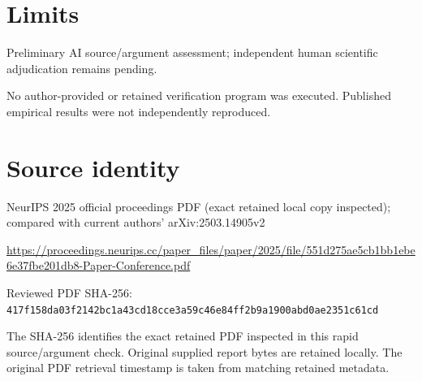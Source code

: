 \documentclass[11pt]{article}
\begin{document}
\section*{Limits}

Preliminary AI source/argument assessment; independent human scientific adjudication remains pending.\par

No author-provided or retained verification program was executed. Published empirical results were not independently reproduced.\par

\section*{Source identity}

NeurIPS 2025 official proceedings PDF (exact retained local copy inspected); compared with current authors’ arXiv:2503.14905v2

\url{https://proceedings.neurips.cc/paper_files/paper/2025/file/551d275ae5cb1bb1ebe6e37fbe201db8-Paper-Conference.pdf}

Reviewed PDF SHA-256: \nolinkurl{417f158da03f2142bc1a43cd18cce3a59c46e84ff2b9a1900abd0ae2351c61cd}

The SHA-256 identifies the exact retained PDF inspected in this rapid source/argument check. Original supplied report bytes are retained locally. The original PDF retrieval timestamp is taken from matching retained metadata.
\end{document}
